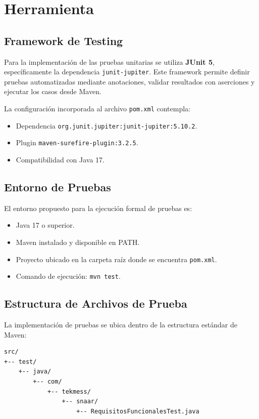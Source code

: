 \documentclass[12pt,a4paper]{article}
\begin{document}
\section{Herramienta}

\subsection{Framework de Testing}

Para la implementación de las pruebas unitarias se utiliza \textbf{JUnit 5}, específicamente la dependencia \texttt{junit-jupiter}. Este framework permite definir pruebas automatizadas mediante anotaciones, validar resultados con aserciones y ejecutar los casos desde Maven.

La configuración incorporada al archivo \texttt{pom.xml} contempla:

\begin{itemize}[leftmargin=*]
    \item Dependencia \texttt{org.junit.jupiter:junit-jupiter:5.10.2}.
    \item Plugin \texttt{maven-surefire-plugin:3.2.5}.
    \item Compatibilidad con Java 17.
\end{itemize}

\subsection{Entorno de Pruebas}

El entorno propuesto para la ejecución formal de pruebas es:

\begin{itemize}[leftmargin=*]
    \item Java 17 o superior.
    \item Maven instalado y disponible en PATH.
    \item Proyecto ubicado en la carpeta raíz donde se encuentra \texttt{pom.xml}.
    \item Comando de ejecución: \texttt{mvn test}.
\end{itemize}

\subsection{Estructura de Archivos de Prueba}

La implementación de pruebas se ubica dentro de la estructura estándar de Maven:

\begin{verbatim}
src/
+-- test/
    +-- java/
        +-- com/
            +-- tekmess/
                +-- snaar/
                    +-- RequisitosFuncionalesTest.java
\end{verbatim}
\end{document}
